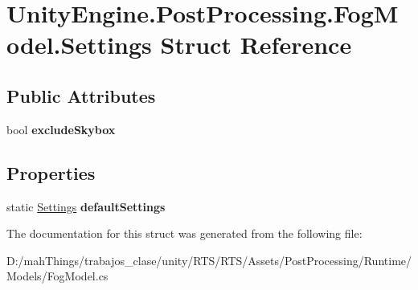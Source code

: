 \hypertarget{struct_unity_engine_1_1_post_processing_1_1_fog_model_1_1_settings}{}\section{Unity\+Engine.\+Post\+Processing.\+Fog\+Model.\+Settings Struct Reference}
\label{struct_unity_engine_1_1_post_processing_1_1_fog_model_1_1_settings}
\subsection*{Public Attributes}
\begin{DoxyCompactItemize}
\item 
\mbox{\label{struct_unity_engine_1_1_post_processing_1_1_fog_model_1_1_settings_a7544429209548509f527ae854bd69684}} 
bool {\bfseries exclude\+Skybox}
\end{DoxyCompactItemize}
\subsection*{Properties}
\begin{DoxyCompactItemize}
\item 
\mbox{\label{struct_unity_engine_1_1_post_processing_1_1_fog_model_1_1_settings_a0d0b889397232348949b1b3357cef242}} 
static \mbox{\hyperlink{struct_unity_engine_1_1_post_processing_1_1_fog_model_1_1_settings}{Settings}} {\bfseries default\+Settings}
\end{DoxyCompactItemize}


The documentation for this struct was generated from the following file\+:\begin{DoxyCompactItemize}
\item 
D\+:/mah\+Things/trabajos\+\_\+clase/unity/\+R\+T\+S/\+R\+T\+S/\+Assets/\+Post\+Processing/\+Runtime/\+Models/Fog\+Model.\+cs\end{DoxyCompactItemize}
